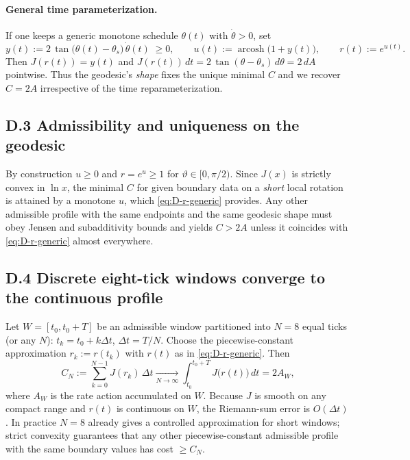 \documentclass[11pt,letterpaper]{article}
\theoremstyle{definition}
\begin{document}
\paragraph{General time parameterization.}
If one keeps a generic monotone schedule \(\theta(t)\) with \(\dot\theta>0\), set
\begin{equation}
y(t):=2\,\tan\bigl(\theta(t)-\theta_s\bigr)\,\dot\theta(t)\;\ge 0,\qquad
u(t):=\operatorname{arcosh}\!\bigl(1+y(t)\bigr),\qquad
r(t):=e^{u(t)}.
\label{eq:D-r-generic}
\end{equation}
Then \(J(r(t))=y(t)\) and \(J(r(t))\,dt=2\,\tan(\theta-\theta_s)\,d\theta=2\,dA\) pointwise. Thus the geodesic’s \emph{shape} fixes the unique minimal \(C\) and we recover \(C=2A\) irrespective of the time reparameterization.

\subsection*{D.3 Admissibility and uniqueness on the geodesic}

By construction \(u\ge 0\) and \(r=e^u\ge 1\) for \(\vartheta\in[0,\pi/2)\). Since \(J(x)\) is strictly convex in \(\ln x\), the minimal \(C\) for given boundary data on a \emph{short} local rotation is attained by a monotone \(u\), which \eqref{eq:D-r-generic} provides. Any other admissible profile with the same endpoints and the same geodesic shape must obey Jensen and subadditivity bounds and yields \(C>2A\) unless it coincides with \eqref{eq:D-r-generic} almost everywhere.

\subsection*{D.4 Discrete eight-tick windows converge to the continuous profile}

Let \(W=[t_0,t_0+T]\) be an admissible window partitioned into \(N=8\) equal ticks (or any \(N\)): \(t_k=t_0+k\Delta t\), \(\Delta t=T/N\). Choose the piecewise-constant approximation \(r_k:=r(t_k)\) with \(r(t)\) as in \eqref{eq:D-r-generic}. Then
\[
C_N:=\sum_{k=0}^{N-1} J(r_k)\,\Delta t \xrightarrow[N\to\infty]{} \int_{t_0}^{t_0+T} J\!\bigl(r(t)\bigr)\,dt = 2A_W,
\]
where \(A_W\) is the rate action accumulated on \(W\). Because \(J\) is smooth on any compact range and \(r(t)\) is continuous on \(W\), the Riemann-sum error is \(O(\Delta t)\). In practice \(N=8\) already gives a controlled approximation for short windows; strict convexity guarantees that any other piecewise-constant admissible profile with the same boundary values has cost \(\ge C_N\).
\end{document}
